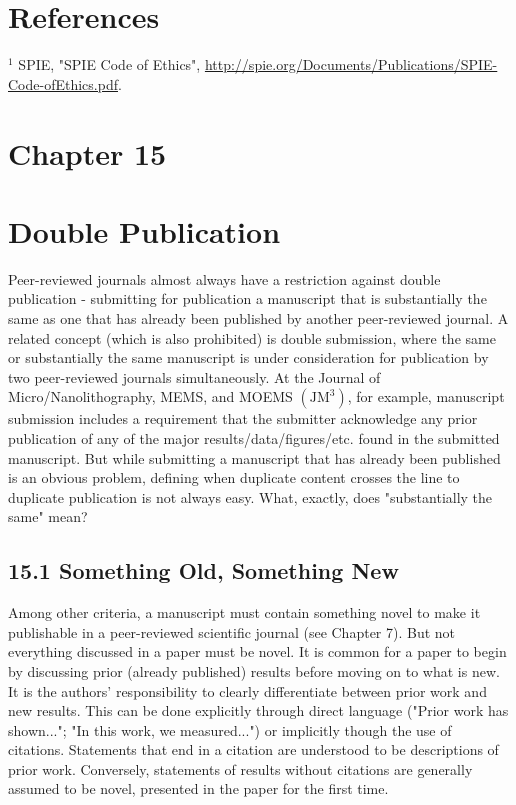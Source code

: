 \section*{References}
${ }^{1}$ SPIE, "SPIE Code of Ethics", \href{http://spie.org/Documents/Publications/SPIE-Code-ofEthics.pdf}{http://spie.org/Documents/Publications/SPIE-Code-ofEthics.pdf}.

\section*{Chapter 15}
\section*{Double Publication}
Peer-reviewed journals almost always have a restriction against double publication - submitting for publication a manuscript that is substantially the same as one that has already been published by another peer-reviewed journal. A related concept (which is also prohibited) is double submission, where the same or substantially the same manuscript is under consideration for publication by two peer-reviewed journals simultaneously. At the Journal of Micro/Nanolithography, MEMS, and MOEMS $\left(\mathrm{JM}^{3}\right)$, for example, manuscript submission includes a requirement that the submitter acknowledge any prior publication of any of the major results/data/figures/etc. found in the submitted manuscript. But while submitting a manuscript that has already been published is an obvious problem, defining when duplicate content crosses the line to duplicate publication is not always easy. What, exactly, does "substantially the same" mean?

\subsection*{15.1 Something Old, Something New}
Among other criteria, a manuscript must contain something novel to make it publishable in a peer-reviewed scientific journal (see Chapter 7). But not everything discussed in a paper must be novel. It is common for a paper to begin by discussing prior (already published) results before moving on to what is new. It is the authors' responsibility to clearly differentiate between prior work and new results. This can be done explicitly through direct language ("Prior work has shown..."; "In this work, we measured...") or implicitly though the use of citations. Statements that end in a citation are understood to be descriptions of prior work. Conversely, statements of results without citations are generally assumed to be novel, presented in the paper for the first time.

